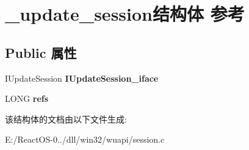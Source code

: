 \hypertarget{struct__update__session}{}\section{\+\_\+update\+\_\+session结构体 参考}
\label{struct__update__session}
\subsection*{Public 属性}
\begin{DoxyCompactItemize}
\item 
\mbox{\label{struct__update__session_a1d9c49cd6d814ad498f0158c120de13a}} 
I\+Update\+Session {\bfseries I\+Update\+Session\+\_\+iface}
\item 
\mbox{\label{struct__update__session_ab3cf0fb08ea5ac0267aa7ed5e50e802c}} 
L\+O\+NG {\bfseries refs}
\end{DoxyCompactItemize}


该结构体的文档由以下文件生成\+:\begin{DoxyCompactItemize}
\item 
E\+:/\+React\+O\+S-\/0../dll/win32/wuapi/session.\+c\end{DoxyCompactItemize}
